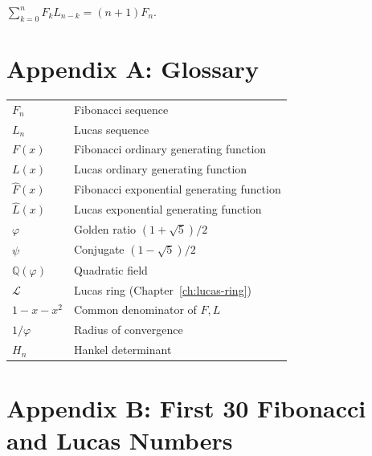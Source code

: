\begin{theorem}
$\sum_{k=0}^n F_k L_{n-k} = (n+1) F_n$.
\end{theorem}

\section*{Appendix A: Glossary}
\label{fa_05:sec:05-app-A}

\begin{tabular}{ll}
$F_n$ & Fibonacci sequence \\
$L_n$ & Lucas sequence \\
$F(x)$ & Fibonacci ordinary generating function \\
$L(x)$ & Lucas ordinary generating function \\
$\hat{F}(x)$ & Fibonacci exponential generating function \\
$\hat{L}(x)$ & Lucas exponential generating function \\
$\varphi$ & Golden ratio $(1+\sqrt{5})/2$ \\
$\psi$ & Conjugate $(1-\sqrt{5})/2$ \\
$\mathbb{Q}(\varphi)$ & Quadratic field \\
$\mathcal{L}$ & Lucas ring (Chapter~\ref{ch:lucas-ring}) \\
$1 - x - x^2$ & Common denominator of $F, L$ \\
$1/\varphi$ & Radius of convergence \\
$H_n$ & Hankel determinant \\
\end{tabular}

\section*{Appendix B: First 30 Fibonacci and Lucas Numbers}
\label{fa_05:sec:05-app-B}

